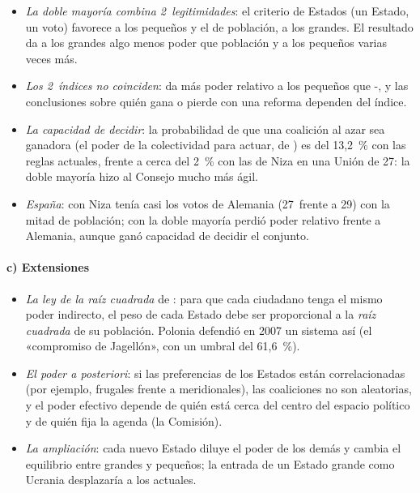 \documentclass[11pt]{article}
\begin{document}
\begin{itemize}
\item \emph{La doble mayoría combina 2~legitimidades}: el criterio de Estados (un Estado, un voto) favorece a los pequeños y el de población, a los grandes. El resultado da a los grandes algo menos poder que población y a los pequeños varias veces más.
\item \emph{Los 2~índices no coinciden}:  da más poder relativo a los pequeños que -, y las conclusiones sobre quién gana o pierde con una reforma dependen del índice.
\item \emph{La capacidad de decidir}: la probabilidad de que una coalición al azar sea ganadora (el poder de la colectividad para actuar, de ) es del 13,2~\% con las reglas actuales, frente a cerca del 2~\% con las de Niza en una Unión de 27\nocite{BaldwinWidgren2004Winners}: la doble mayoría hizo al Consejo mucho más ágil.
\item \emph{España}: con Niza tenía casi los votos de Alemania (27~frente a 29) con la mitad de población; con la doble mayoría perdió poder relativo frente a Alemania, aunque ganó capacidad de decidir el conjunto.
\end{itemize}

\paragraph{c) Extensiones}

\begin{itemize}
\item \emph{La ley de la raíz cuadrada} de \textcite{Penrose1946Elementary}: para que cada ciudadano tenga el mismo poder indirecto, el peso de cada Estado debe ser proporcional a la \emph{raíz cuadrada} de su población. Polonia defendió en 2007 un sistema así (el «compromiso de Jagellón», con un umbral del 61,6~\%)\nocite{SlomczynskiZyczkowski2006Penrose}.
\item \emph{El poder a posteriori}: si las preferencias de los Estados están correlacionadas (por ejemplo, frugales frente a meridionales), las coaliciones no son aleatorias, y el poder efectivo depende de quién está cerca del centro del espacio político y de quién fija la agenda (la Comisión)\nocite{FelsenthalMachover1998Measurement}.
\item \emph{La ampliación}: cada nuevo Estado diluye el poder de los demás y cambia el equilibrio entre grandes y pequeños; la entrada de un Estado grande como Ucrania desplazaría a los actuales.
\end{itemize}
\end{document}
